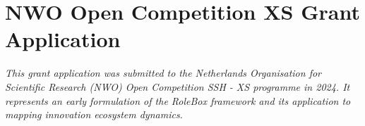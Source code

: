 \documentclass[../main.tex]{subfiles}
\begin{document}
\chapter{NWO Open Competition XS Grant Application}

\begin{fullwidthpar}
\textit{This grant application was submitted to the Netherlands Organisation for Scientific Research (NWO) Open Competition SSH - XS programme in 2024. It represents an early formulation of the RoleBox framework and its application to mapping innovation ecosystem dynamics.}
\end{fullwidthpar}

\vspace{1cm}


\end{document}

